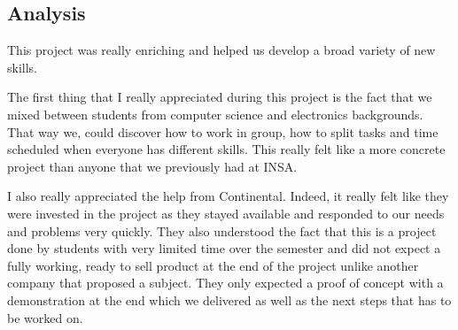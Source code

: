 \subsection{Analysis}

This project was really enriching and helped us develop a broad variety of new skills. \\\par

The first thing that I really appreciated during this project is the fact that we mixed between students from computer science and electronics backgrounds. That way we, could discover how to work in group, how to split tasks and time scheduled when everyone has different skills. This really felt like a more concrete project than anyone that we previously had at INSA.  \\\par

I also really appreciated the help from Continental. Indeed, it really felt like they were invested in the project as they stayed available and responded to our needs and problems very quickly. They also understood the fact that this is a project done by students with very limited time over the semester and did not expect a fully working, ready to sell product at the end of the project unlike another company that proposed a subject. They only expected a proof of concept with a demonstration at the end which we delivered as well as the next steps that has to be worked on.